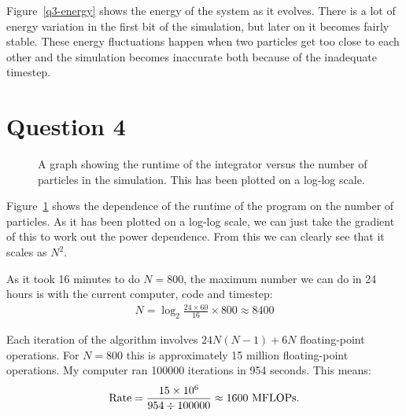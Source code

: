 \documentclass[11pt]{article}
\begin{document}
Figure~\ref{q3-energy} shows the energy of the system as it evolves. There is a lot of energy variation in the first bit of the simulation, but later on it becomes fairly stable. These energy fluctuations happen when two particles get too close to each other and the simulation becomes inaccurate both because of the inadequate timestep.

\section{Question 4}
\begin{figure}
  \centering
\resizebox{0.6\textwidth}{!}{}
  \caption{A graph showing the runtime of the integrator versus the number of particles in the simulation. This has been plotted on a log-log scale.}
  \label{q4}
\end{figure}
Figure~\ref{q4} shows the dependence of the runtime of the program on the number of particles. As it has been plotted on a log-log scale, we can just take the gradient of this to work out the power dependence. From this we can clearly see that it scales as $N^2$.

As it took 16 minutes to do $N=800$, the maximum number we can do in 24 hours is with the current computer, code and timestep:
\begin{eqnarray}
N = \log_2 \frac{24 \times 60}{16} \times 800 \approx 8400
\end{eqnarray}

Each iteration of the algorithm involves $24N(N-1) + 6 N$ floating-point operations. For $N=800$ this is approximately 15 million floating-point operations. My computer ran 100000 iterations in 954 seconds. This means:
\begin{eqnarray}
\textnormal{Rate} = \frac{15 \times 10^6} { 954 \div 100000 } \approx 1600~\textnormal{MFLOPs}.
\end{eqnarray}
\end{document}
